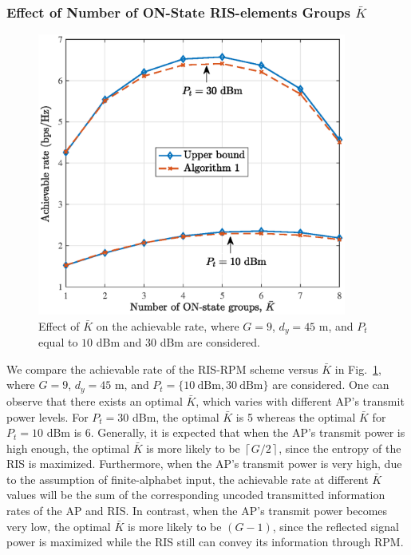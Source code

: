 \documentclass[draftclsnofoot,onecolumn,12pt]{IEEEtran}
\begin{document}

\subsubsection{Effect of Number of ON-State RIS-elements Groups $\bar{K}$}

\begin{figure}[!t]
	\centering
	\includegraphics[width=4in]{1.eps}
	\caption{Effect of $\bar{K}$ on the achievable rate, where $G=9$, $d_y=45$ m, and $P_t$ equal to $10$ dBm and $30$ dBm are considered.}
	\label{active}
\end{figure}

We compare the achievable rate of the RIS-RPM scheme versus $\bar{K}$ in Fig.~\ref{active}, where $G=9$, $d_y=45$ m, and $P_t=\{10~\text{dBm}, 30~\text{dBm}\}$ are considered. One can observe that there exists an optimal $\bar{K}$, which varies with different AP's transmit power levels. 
For $P_t=30$ dBm, the optimal $\bar{K}$ is 5 whereas the optimal $\bar{K}$ for $P_t=10$ dBm is 6. 
Generally, it is expected that when the AP's transmit power is high enough, the optimal $\bar{K}$ is more likely to be $\left\lceil G/2\right\rceil$, since the entropy of the RIS is maximized. 
Furthermore, when the AP's transmit power is very high, due to the assumption of finite-alphabet input, the achievable rate at different $\bar{K}$ values will be the sum of the corresponding uncoded transmitted information rates of the AP and RIS. 
In contrast, when the AP's transmit power becomes very low, the optimal $\bar{K}$ is more likely to be $(G-1)$, since the reflected signal power is maximized while the RIS still can convey its information through RPM. 
\end{document}
